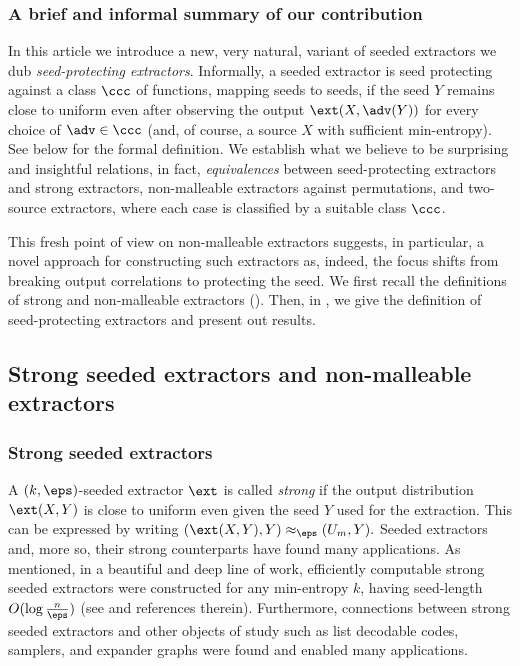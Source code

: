 \documentclass{toc}
\begin{document}
\subsubsection*{A brief and informal summary of our contribution}
%

In this %
article  %
we introduce a new, very natural, variant of seeded extractors we dub \emph{seed-protecting extractors}. Informally, a seeded extractor is seed protecting 
against a class %
$\ccc$ of functions,
mapping seeds to seeds, if the seed $Y$ remains close to uniform even after observing the output $\ext(X,\adv(Y))$ for every choice of $\adv \in \ccc$ (and, of course, a source $X$ with sufficient min-entropy). See  below for the formal definition. We establish what we believe to be surprising and insightful relations, in fact, \emph{equivalences} between seed-protecting extractors and strong extractors, non-malleable extractors against permutations, and two-source extractors, where each case is classified by a suitable class $\ccc$. 
 
 This fresh point of view on non-malleable extractors suggests, in particular, a novel approach for constructing such extractors as, indeed, the focus shifts from breaking output correlations to protecting the seed.  
%
 We first recall the definitions of strong and non-malleable extractors (). Then, in , we give the definition of seed-protecting extractors and present out results.

%
%

%

\subsection{Strong seeded extractors and non-malleable extractors}\label{sec:strong and nm}

%
%
\subsubsection{Strong seeded extractors}
%
A $(k,\eps)$-seeded extractor $\ext$ is called \emph{strong} if the output distribution $\ext(X,Y)$ is close to uniform even given the seed $Y$ used for the extraction. This can be expressed by writing
$
(\ext(X,Y),Y) \approx_\eps (U_m,Y).
$
Seeded extractors and, more so, their strong counterparts have found many applications. As mentioned, in a beautiful and deep line of work, efficiently computable strong seeded extractors were constructed for any min-entropy $k$, having seed-length $O(\log\frac{n}{\eps})$ (see \cite{GUV09,DKSS13,TSU12} and references therein). Furthermore,  connections between strong seeded extractors and other objects of study such as list decodable codes, samplers, and expander graphs were found and enabled many applications.%
\end{document}
